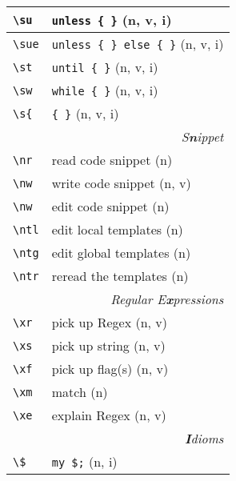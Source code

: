 \documentclass[oneside,10pt,landscape,DIV16]{scrartcl}
\begin{document}
\begin{multicols}{3}
\begin{center}
\begin{tabular}[]{|p{11mm}|p{58mm}|}
\hline \verb'\su'  & \verb'unless { }'                 \hfill (n, v, i)\\
\hline \verb'\sue' & \verb'unless { } else { }'        \hfill (n, v, i)\\
\hline \verb'\st'  & \verb'until { }'                  \hfill (n, v, i)\\
\hline \verb'\sw'  & \verb'while { }'                  \hfill (n, v, i)\\
\hline \verb'\s{'  & \verb'{ }'                        \hfill (n, v, i)\\
\hline
\hline
\multicolumn{2}{|r|}{\textsl{S\textbf{n}ippet}} \\
\hline \verb'\nr'  & read code snippet                 \hfill (n)\\
\hline \verb'\nw'  & write code snippet                \hfill (n, v)\\
\hline \verb'\nw'  & edit code snippet                 \hfill (n)\\
%
\hline \verb'\ntl' & edit local templates      \hfill (n)\\
\hline \verb'\ntg' & edit global templates     \hfill (n)\\
\hline \verb'\ntr' & reread the templates      \hfill (n)\\
\hline
\hline
\multicolumn{2}{|r|}{\textsl{Regular E\textbf{x}pressions}} \\
\hline \verb'\xr' &  pick up Regex             \hfill (n, v)\\
\hline \verb'\xs' &  pick up string            \hfill (n, v)\\
\hline \verb'\xf' &  pick up flag(s)           \hfill (n, v)\\
\hline \verb'\xm' &  match                     \hfill (n)\\
\hline \verb'\xe' &  explain Regex             \hfill (n, v)\\
\hline
\hline
\multicolumn{2}{|r|}{\textsl{\textbf{I}dioms}}   \\
\hline \verb'\$'   & \verb'my $;'              \hfill (n, i)\\

\end{tabular}
\end{center}
\end{multicols}
\end{document}
